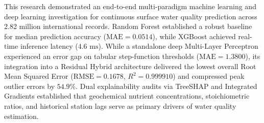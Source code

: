 \documentclass[conference]{IEEEtran}
\begin{document}
This research demonstrated an end-to-end multi-paradigm machine learning and deep learning investigation for continuous surface water quality prediction across 2.82 million international records. Random Forest established a robust baseline for median prediction accuracy ($\text{MAE} = 0.0514$), while XGBoost achieved real-time inference latency ($4.6\text{ ms}$). While a standalone deep Multi-Layer Perceptron experienced an error gap on tabular step-function thresholds ($\text{MAE} = 1.3800$), its integration into a Residual Hybrid architecture delivered the lowest overall Root Mean Squared Error ($\text{RMSE} = 0.1678$, $R^2 = 0.999910$) and compressed peak outlier errors by $54.9\%$. Dual explainability audits via TreeSHAP and Integrated Gradients established that geochemical nutrient concentrations, stoichiometric ratios, and historical station lags serve as primary drivers of water quality estimation.

\balance


\end{document}
